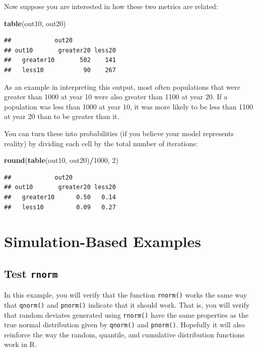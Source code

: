 \documentclass[]{book}
\newenvironment{Shaded}{\begin{snugshade}}{\end{snugshade}}
\newcommand{\KeywordTok}[1]{\textcolor[rgb]{0.13,0.29,0.53}{\textbf{#1}}}
\newcommand{\DecValTok}[1]{\textcolor[rgb]{0.00,0.00,0.81}{#1}}
\newcommand{\OperatorTok}[1]{\textcolor[rgb]{0.81,0.36,0.00}{\textbf{#1}}}
\newcommand{\NormalTok}[1]{#1}
\theoremstyle{definition}
\theoremstyle{definition}
\theoremstyle{definition}
\theoremstyle{remark}
\begin{document}
Now suppose you are interested in how these two metrics are related:

\begin{Shaded}
\begin{Highlighting}[]
\KeywordTok{table}\NormalTok{(out10, out20)}
\end{Highlighting}
\end{Shaded}

\begin{verbatim}
##            out20
## out10       greater20 less20
##   greater10       502    141
##   less10           90    267
\end{verbatim}

As an example in interpreting this output, most often populations that
were greater than 1000 at year 10 were also greater than 1100 at year
20. If a population was less than 1000 at year 10, it was more likely to
be less than 1100 at year 20 than to be greater than it.

You can turn these into probabilities (if you believe your model
represents reality) by dividing each cell by the total number of
iterations:

\begin{Shaded}
\begin{Highlighting}[]
\KeywordTok{round}\NormalTok{(}\KeywordTok{table}\NormalTok{(out10, out20)}\OperatorTok{/}\DecValTok{1000}\NormalTok{, }\DecValTok{2}\NormalTok{)}
\end{Highlighting}
\end{Shaded}

\begin{verbatim}
##            out20
## out10       greater20 less20
##   greater10      0.50   0.14
##   less10         0.09   0.27
\end{verbatim}

\section{Simulation-Based Examples}\label{sim-examples}

\subsection{\texorpdfstring{Test
\texttt{rnorm}}{Test rnorm}}\label{rnorm-ex}

In this example, you will verify that the function \texttt{rnorm()}
works the same way that \texttt{qnorm()} and \texttt{pnorm()} indicate
that it should work. That is, you will verify that random deviates
generated using \texttt{rnorm()} have the same properties as the true
normal distribution given by \texttt{qnorm()} and \texttt{pnorm()}.
Hopefully it will also reinforce the way the random, quantile, and
cumulative distribution functions work in R.
\end{document}

